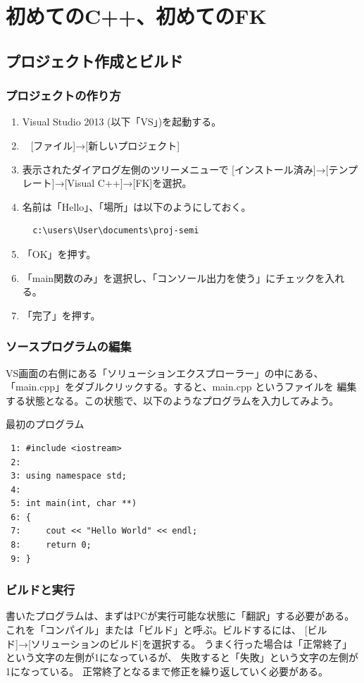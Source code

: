 ﻿\chapter{初めてのC++、初めてのFK}
\section{プロジェクト作成とビルド} \label{sec:01-proj}
\subsection{プロジェクトの作り方} \label{sec:01-projmake}
\begin{enumerate}
 \item Visual Studio 2013 (以下「VS」)を起動する。
 \item ~ [ファイル]→[新しいプロジェクト]
 \item 表示されたダイアログ左側のツリーメニューで
	[インストール済み]→[テンプレート]→[Visual C++]→[FK]を選択。
 \item 名前は「Hello」、「場所」は以下のようにしておく。
\begin{screen}
\begin{verbatim}
  c:\users\User\documents\proj-semi
\end{verbatim}
\end{screen}
 \item 「OK」を押す。
 \item 「main関数のみ」を選択し、「コンソール出力を使う」にチェックを入れる。
 \item 「完了」を押す。
\end{enumerate}
\subsection{ソースプログラムの編集} \label{sec:01-sourceedit}
VS画面の右側にある「ソリューションエクスプローラー」の中にある、
「main.cpp」をダブルクリックする。すると、main.cpp というファイルを
編集する状態となる。この状態で、以下のようなプログラムを入力してみよう。
\begin{itembox}[l]{最初のプログラム}
\begin{verbatim}
 1: #include <iostream>
 2: 
 3: using namespace std;
 4: 
 5: int main(int, char **)
 6: {
 7:     cout << "Hello World" << endl;
 8:     return 0;
 9: }
\end{verbatim}
\end{itembox}
\subsection{ビルドと実行} \label{sec:01-buildrun}
書いたプログラムは、まずはPCが実行可能な状態に「翻訳」する必要がある。
これを「コンパイル」または「ビルド」と呼ぶ。ビルドするには、
[ビルド]→[ソリューションのビルド]を選択する。
うまく行った場合は「正常終了」という文字の左側が1になっているが、
失敗すると「失敗」という文字の左側が1になっている。
正常終了となるまで修正を繰り返していく必要がある。

